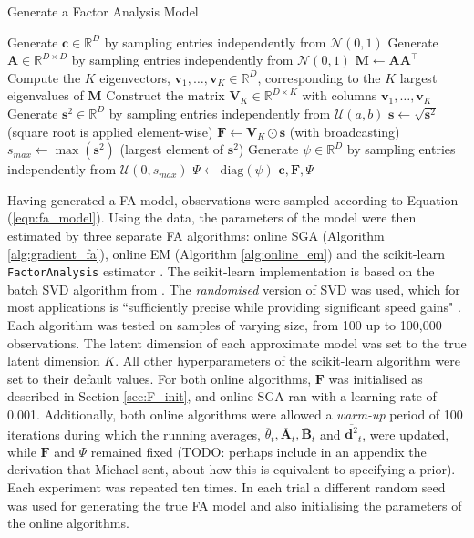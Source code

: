 \documentclass[msc,deptreport.inf]{infthesis} %
\newcommand{\matr}[1]{\mathbf{#1}}
\newcommand{\R}{\mathbb R}
\begin{document}
\begin{algorithm}[!htbp] 
	\caption{Generate a Factor Analysis Model}
	\label{alg:generate_fa}
	\begin{algorithmic}[1]
		\State Generate $\matr{c} \in \R^D$ by sampling entries independently from $\mathcal{N}(0, 1)$
		\State Generate $\matr{A} \in \R^{D \times D}$ by sampling entries independently from $\mathcal{N}(0, 1)$
		\State $\matr{M} \leftarrow \matr{A} \matr{A}^\intercal$
		\State Compute the $K$ eigenvectors, $\matr{v}_1, \dots, \matr{v}_K \in \R^D$, corresponding to the $K$ largest eigenvalues of $\matr{M}$
		\State Construct the matrix $\matr{V}_K \in \R^{D \times K}$ with columns $\matr{v}_1, \dots, \matr{v}_K$
		\State Generate $\matr{s}^2 \in \R^D$ by sampling entries independently from $\mathcal{U}(a, b)$
		\State $\matr{s} \leftarrow \sqrt{\matr{s}^2}$ (square root is applied element-wise) 
		\State $\matr{F} \leftarrow \matr{V}_K \odot \matr{s}$ (with broadcasting)
		\State $s_{max} \leftarrow \max({\matr{s}^2})$ (largest element of ${\matr{s}^2}$)
		\State Generate $\psi \in \R^D$ by sampling entries independently from $\mathcal{U}(0, s_{max}) $
		\State $\Psi \leftarrow \text{diag}(\psi)$
		\State \Return $\matr{c}, \matr{F}, \Psi$	
	\end{algorithmic}
\end{algorithm}

Having generated a FA model, observations were sampled according to Equation (\ref{eqn:fa_model}). Using the data, the parameters of the model were then estimated by three separate FA algorithms: online SGA (Algorithm \ref{alg:gradient_fa}), online EM (Algorithm \ref{alg:online_em}) and the scikit-learn \texttt{FactorAnalysis} estimator \cite{pedregosa2012}. The scikit-learn implementation is based on the batch SVD algorithm from \cite{barber2007}. The \emph{randomised} version of SVD was used, which for most applications is  ``sufficiently precise while providing significant speed gains" \cite{pedregosa2012}. Each algorithm was tested on samples of varying size, from 100 up to 100,000 observations. The latent dimension of each approximate model was set to the true latent dimension $K$. All other hyperparameters of the scikit-learn algorithm were set to their default values. For both online algorithms, $\matr{F}$ was initialised as described in Section \ref{sec:F_init}, and online SGA ran with a learning rate of 0.001. Additionally, both online algorithms were allowed a \emph{warm-up} period of 100 iterations during which the running averages, $\overline{\theta}_t, \overline{\matr{A}}_t, \overline{\matr{B}}_t$ and $\overline{\matr{d}^2}_t$, were updated, while $\matr{F}$ and $\Psi$ remained fixed (TODO: perhaps include in an appendix the derivation that Michael sent, about how this is equivalent to specifying a prior). Each experiment was repeated ten times. In each trial a different random seed was used for generating the true FA model and also initialising the parameters of the online algorithms. 
\end{document}
